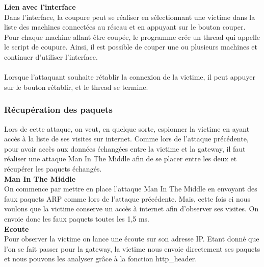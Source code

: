 \documentclass[11pt]{article}
\begin{document}
\textbf{Lien avec l'interface}~\\

Dans l'interface, la coupure peut se réaliser en sélectionnant une victime dans la liste des machines connectées au réseau et en appuyant sur le bouton couper. Pour chaque machine allant être coupée, le programme crée un thread qui appelle le script de coupure. Ainsi, il est possible de couper une ou plusieurs machines et continuer d'utiliser l'interface. ~\\
~\\

Lorsque l'attaquant souhaite rétablir la connexion de la victime, il peut appuyer sur le bouton rétablir, et le thread se termine.~\\


\subsubsection{Récupération des paquets}
Lors de cette attaque, on veut, en quelque sorte, espionner la victime en ayant accès à la liste de ses visites sur internet. Comme lors de l'attaque précédente, pour avoir accès aux données échangées entre la victime et la gateway, il faut réaliser une attaque Man In The Middle afin de se placer entre les deux et récupérer les paquets échangés.~\\

\textbf{Man In The Middle}~\\

On commence par mettre en place l'attaque Man In The Middle en envoyant des faux paquets ARP comme lors de l'attaque précédente. Mais, cette fois ci nous voulons que la victime conserve un accès à internet afin d'observer ses visites. On envoie donc les faux paquets toutes les 1,5 ms.~\\


\textbf{Ecoute}~\\

Pour observer la victime on lance une écoute sur son adresse IP. Etant donné que l'on se fait passer pour la gateway, la victime nous envoie directement ses paquets et nous pouvons les analyser grâce à la fonction http\_header.~\\

\end{document}
